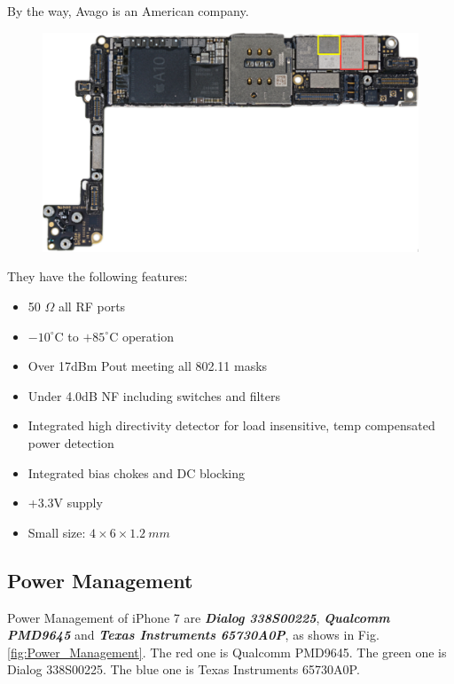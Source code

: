 \documentclass[conference]{IEEEtran}
\begin{document}
By the way, Avago is an American company\cite{Avago.org}.
\begin{figure}[!ht]
	\centering
	\begin{center}
		\includegraphics*[width=0.8\linewidth]{Power_Amplifier}
		\caption{}
		\label{fig:Power_Amplifier}
	\end{center}
\end{figure}

They have the following features:\cite{datasheet.org}
\begin{itemize}
	\item 50 $\Omega$ all RF ports
	\item $-10^{\circ}$C to $+85^{\circ}$C operation
	\item Over 17dBm Pout meeting all 802.11 masks
	\item Under 4.0dB NF including switches and filters
	\item Integrated high directivity detector for load insensitive, temp compensated power detection
	\item Integrated bias chokes and DC blocking
	\item +3.3V supply
	\item Small size: $4\times6\times1.2\ mm$
\end{itemize}

\subsection{Power Management}
Power Management of iPhone 7 are {\bfseries{\emph{Dialog 338S00225}}}, {\bfseries{\emph{Qualcomm PMD9645}}} and {\bfseries{\emph{Texas Instruments 65730A0P}}}, as shows in Fig.\ref{fig:Power_Management}. The red one is Qualcomm PMD9645. The green one is Dialog 338S00225. The blue one is Texas Instruments 65730A0P.
\end{document}
